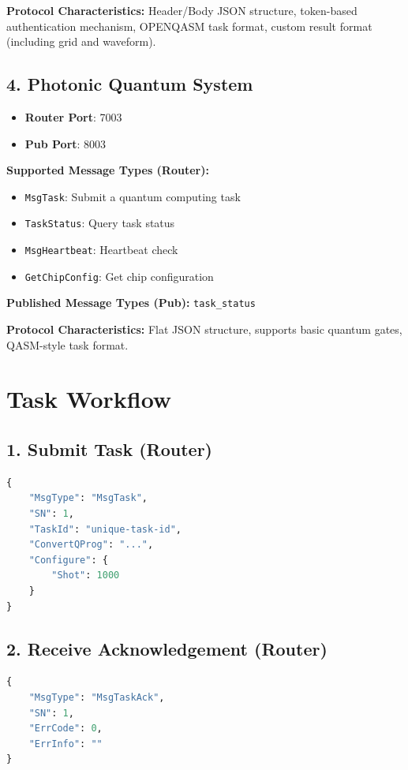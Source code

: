 \documentclass[UTF8, a4paper, 12pt]{article}
\begin{document}
\textbf{Protocol Characteristics:} Header/Body JSON structure, token-based authentication mechanism, OPENQASM task format, custom result format (including grid and waveform).

\subsection{4. Photonic Quantum System}
\begin{itemize}
    \item \textbf{Router Port}: 7003
    \item \textbf{Pub Port}: 8003
\end{itemize}

\textbf{Supported Message Types (Router):}
\begin{itemize}
    \item \texttt{MsgTask}: Submit a quantum computing task
    \item \texttt{TaskStatus}: Query task status
    \item \texttt{MsgHeartbeat}: Heartbeat check
    \item \texttt{GetChipConfig}: Get chip configuration
\end{itemize}

\textbf{Published Message Types (Pub):} \texttt{task\_status}

\textbf{Protocol Characteristics:} Flat JSON structure, supports basic quantum gates, QASM-style task format.

\section{Task Workflow}

\subsection{1. Submit Task (Router)}
\begin{lstlisting}[language=Python]
{
    "MsgType": "MsgTask",
    "SN": 1,
    "TaskId": "unique-task-id",
    "ConvertQProg": "...",
    "Configure": {
        "Shot": 1000
    }
}
\end{lstlisting}

\subsection{2. Receive Acknowledgement (Router)}
\begin{lstlisting}[language=Python]
{
    "MsgType": "MsgTaskAck",
    "SN": 1,
    "ErrCode": 0,
    "ErrInfo": ""
}
\end{lstlisting}
\end{document}
